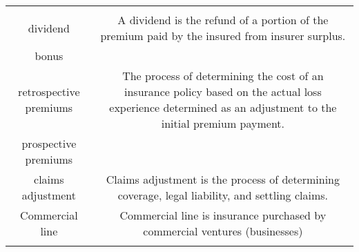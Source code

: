 \documentclass[]{book}
\theoremstyle{definition}
\theoremstyle{definition}
\theoremstyle{definition}
\theoremstyle{remark}
\begin{document}
\begin{longtable}[]{@{}cc@{}}
\begin{minipage}[t]{0.42\columnwidth}
\strut
\end{minipage}\tabularnewline
\begin{minipage}[t]{0.39\columnwidth}\centering\strut
dividend\strut
\end{minipage} & \begin{minipage}[t]{0.42\columnwidth}\centering\strut
A dividend is the refund of a portion of the premium paid by the insured
from insurer surplus.\strut
\end{minipage}\tabularnewline
\begin{minipage}[t]{0.39\columnwidth}\centering\strut
bonus\strut
\end{minipage} & \begin{minipage}[t]{0.42\columnwidth}\centering\strut
\strut
\end{minipage}\tabularnewline
\begin{minipage}[t]{0.39\columnwidth}\centering\strut
retrospective premiums\strut
\end{minipage} & \begin{minipage}[t]{0.42\columnwidth}\centering\strut
The process of determining the cost of an insurance policy based on the
actual loss experience determined as an adjustment to the initial
premium payment.\strut
\end{minipage}\tabularnewline
\begin{minipage}[t]{0.39\columnwidth}\centering\strut
prospective premiums\strut
\end{minipage} & \begin{minipage}[t]{0.42\columnwidth}\centering\strut
\strut
\end{minipage}\tabularnewline
\begin{minipage}[t]{0.39\columnwidth}\centering\strut
claims adjustment\strut
\end{minipage} & \begin{minipage}[t]{0.42\columnwidth}\centering\strut
Claims adjustment is the process of determining coverage, legal
liability, and settling claims.\strut
\end{minipage}\tabularnewline
\begin{minipage}[t]{0.39\columnwidth}\centering\strut
Commercial line\strut
\end{minipage} & \begin{minipage}[t]{0.42\columnwidth}\centering\strut
Commercial line is insurance purchased by commercial ventures
(businesses)\strut
\end{minipage}\tabularnewline
\begin{minipage}[t]{0.39\columnwidth}\centering\strut

\end{minipage}
\end{longtable}
\end{document}

